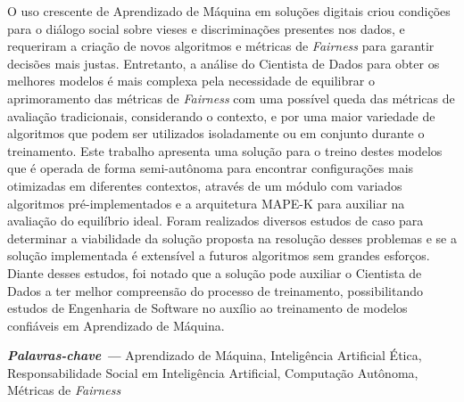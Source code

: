 \documentclass[portugues]{ic-tese}
\providecommand{\palavraschave}[1]
{
  \small	
  \textbf{\textit{Palavras-chave ---}} #1
}
\begin{document}
\begin{resumo}
O uso crescente de Aprendizado de Máquina em soluções digitais criou condições para o diálogo social sobre vieses e discriminações presentes nos dados, e requeriram a criação de novos algoritmos e métricas de \textit{Fairness} para garantir decisões mais justas. Entretanto, a análise do Cientista de Dados para obter os melhores modelos é mais complexa pela necessidade de equilibrar o aprimoramento das métricas de \textit{Fairness} com uma possível queda das métricas de avaliação tradicionais, considerando o contexto, e por uma maior variedade de algoritmos que podem ser utilizados isoladamente ou em conjunto durante o treinamento. Este trabalho apresenta uma solução para o treino destes modelos que é operada de forma semi-autônoma para encontrar configurações mais otimizadas em diferentes contextos, através de um módulo com variados algoritmos pré-implementados e a arquitetura MAPE-K para auxiliar na avaliação do equilíbrio ideal. Foram realizados diversos estudos de caso para determinar a viabilidade da solução proposta na resolução desses problemas e se a solução implementada é extensível a futuros algoritmos sem grandes esforços. Diante desses estudos, foi notado que a solução pode auxiliar o Cientista de Dados a ter melhor compreensão do processo de treinamento, possibilitando estudos de Engenharia de Software no auxílio ao treinamento de modelos confiáveis em Aprendizado de Máquina.

\palavraschave{Aprendizado de Máquina, Inteligência Artificial Ética, Responsabilidade Social em Inteligência Artificial, Computação Autônoma, Métricas de \textit{Fairness}}
\end{resumo}
\end{document}
